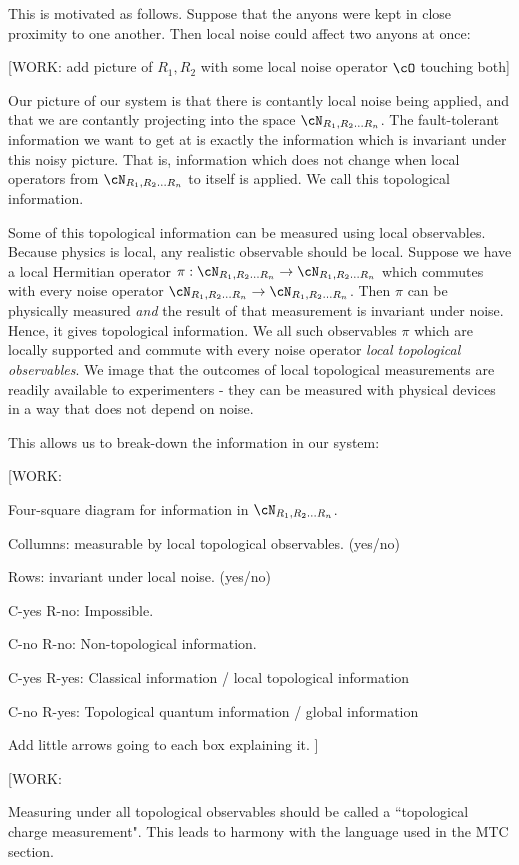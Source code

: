 This is motivated as follows. Suppose that the anyons were kept in close proximity to one another. Then local noise could affect two anyons at once:

[WORK: add picture of $R_1,R_2$ with some local noise operator $\cO$ touching both]

Our picture of our system is that there is contantly local noise being applied, and that we are contantly projecting into the space $\cN_{R_1,R_2... R_n}$. The fault-tolerant information we want to get at is exactly the information which is invariant under this noisy picture. That is, information which does not change when local operators from $\cN_{R_1,R_2... R_n}$ to itself is applied. We call this topological information.

Some of this topological information can be measured using local observables. Because physics is local, any realistic observable should be local. Suppose we have a local Hermitian operator $\pi: \cN_{R_1,R_2... R_n}\to \cN_{R_1,R_2... R_n}$ which commutes with every noise operator $\cN_{R_1,R_2... R_n}\to \cN_{R_1,R_2... R_n}$. Then $\pi$ can be physically measured \textit{and} the result of that measurement is invariant under noise. Hence, it gives topological information. We all such observables $\pi$ which are locally supported and commute with every noise operator \textit{local topological observables}. We image that the outcomes of local topological measurements are readily available to experimenters - they can be measured with physical devices in a way that does not depend on noise.

This allows us to break-down the information in our system:

[WORK:

Four-square diagram for information in $\cN_{R_1,R_2... R_n}$.

Collumns: measurable by local topological observables. (yes/no)

Rows: invariant under local noise. (yes/no)

C-yes R-no: Impossible.

C-no R-no: Non-topological information.

C-yes R-yes: Classical information / local topological information

C-no R-yes: Topological quantum information / global information 

Add little arrows going to each box explaining it.
]


[WORK:

Measuring under all topological observables should be called a ``topological charge measurement". This leads to harmony with the language used in the MTC section.

